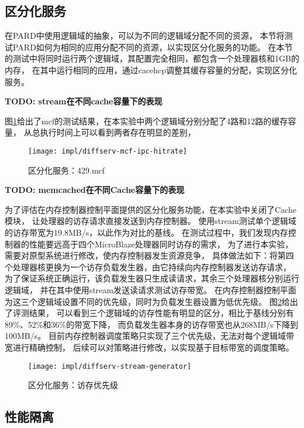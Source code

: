 \subsection{区分化服务}

在PARD中使用逻辑域的抽象，可以为不同的逻辑域分配不同的资源，
本节将测试PARD如何为相同的应用分配不同的资源，以实现区分化服务的功能。
在本节的测试中将同时运行两个逻辑域，其配置完全相同，都包含一个处理器核和1GB的内存，
在其中运行相同的应用，通过cacehcp调整其缓存容量的分配，实现区分化服务。

\textbf{TODO: stream在不同cache容量下的表现}


图\ref{fig:diffserv-mcf-ipc-hitrate}给出了mcf的测试结果，在本实验中两个逻辑域分别分配了4路和12路的缓存容量，
从总执行时间上可以看到两者存在明显的差别，

\begin{figure}[tb]
  \centering
  \texttt{[image: impl/diffserv-mcf-ipc-hitrate]}
  \caption{区分化服务：429.mcf}
  \label{fig:diffserv-mcf-ipc-hitrate}
\end{figure}


\textbf{TODO: memcached在不同Cache容量下的表现}

为了评估在内存控制器控制平面提供的区分化服务功能，在本实验中关闭了Cache模块，
让处理器的访存请求直接发送到内存控制器。
使用stream测试单个逻辑域的访存带宽为19.8MB/s，以此作为对比的基线。
在测试过程中，我们发现内存控制器的性能要远高于四个MicroBlaze处理器同时访存的需求，
为了进行本实验，需要对原型系统进行修改，使内存控制器发生资源竞争，
具体做法如下：将第四个处理器核更换为一个访存负载发生器，由它持续向内存控制器发送访存请求，
为了保证系统正确运行，该负载发生器只生成读请求，其余三个处理器核分别运行逻辑域，
并在其中使用stream发送读请求测试访存带宽。
在内存控制器控制平面为这三个逻辑域设置不同的优先级，同时为负载发生器设置为低优先级。
图\ref{fig:diffserv-stream-generator}给出了评测结果，
可以看到三个逻辑域的访存性能有明显的区分，相比于基线分别有89\%、52\%和36\%的带宽下降，
而负载发生器本身的访存带宽也从268MB/s下降到100MB/s。
目前内存控制器调度策略只实现了三个优先级，无法对每个逻辑域带宽进行精确控制，
后续可以对策略进行修改，以实现基于目标带宽的调度策略。

\begin{figure}[htb]
  \centering
  \texttt{[image: impl/diffserv-stream-generator]}
  \caption{区分化服务：访存优先级}
  \label{fig:diffserv-stream-generator}
\end{figure}

\subsection{性能隔离}

